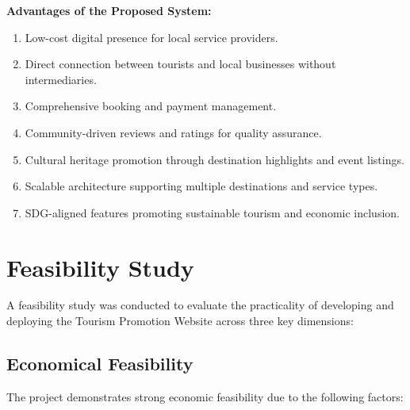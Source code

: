 \textbf{Advantages of the Proposed System:}
\begin{enumerate}[leftmargin=2em]
    \item Low-cost digital presence for local service providers.
    \item Direct connection between tourists and local businesses without intermediaries.
    \item Comprehensive booking and payment management.
    \item Community-driven reviews and ratings for quality assurance.
    \item Cultural heritage promotion through destination highlights and event listings.
    \item Scalable architecture supporting multiple destinations and service types.
    \item SDG-aligned features promoting sustainable tourism and economic inclusion.
\end{enumerate}

\section{Feasibility Study}

A feasibility study was conducted to evaluate the practicality of developing and deploying the Tourism Promotion Website across three key dimensions:

\subsection{Economical Feasibility}

The project demonstrates strong economic feasibility due to the following factors:

